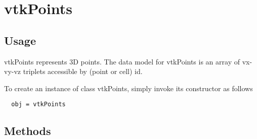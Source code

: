 \section{vtkPoints}

\subsection{Usage}

 vtkPoints represents 3D points. The data model for vtkPoints is an 
 array of vx-vy-vz triplets accessible by (point or cell) id.

To create an instance of class vtkPoints, simply
invoke its constructor as follows
\begin{verbatim}
  obj = vtkPoints
\end{verbatim}
\subsection{Methods}


